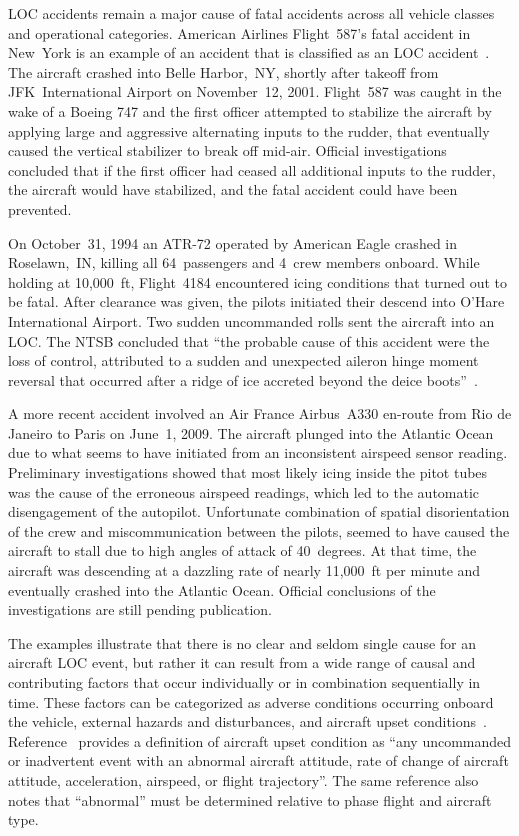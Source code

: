 \documentclass[letter,onecolumn,12pt]{aiaa-tc}
\begin{document}
LOC accidents remain a major cause of fatal accidents across all vehicle classes and operational categories. American Airlines Flight~587's fatal accident in New~York is an example of an accident that is classified as an LOC accident~\cite{MST08_upsets}. The aircraft crashed into Belle Harbor,~NY, shortly after takeoff from JFK~International Airport on November~12, 2001. Flight~587 was caught in the wake of a Boeing 747 and the first officer attempted to stabilize the aircraft by applying large and aggressive alternating inputs to the rudder, that eventually caused the vertical stabilizer to break off mid-air. Official investigations concluded that if the first officer had ceased all additional inputs to the rudder, the aircraft would have stabilized, and the fatal accident could have been prevented.


On October~31, 1994 an ATR-72 operated by American Eagle crashed in Roselawn,~IN, killing all 64~passengers and 4~crew members onboard. While holding at 10,000~ft, Flight~4184 encountered icing conditions that turned out to be fatal. After clearance was given, the pilots initiated their descend into O'Hare International Airport. Two sudden uncommanded rolls sent the aircraft into an LOC. The NTSB concluded that ``the probable cause of this accident were the loss of control, attributed to a sudden and unexpected aileron hinge moment reversal that occurred after a ridge of ice accreted beyond the deice boots''~\cite{ATR72}.


A more recent accident involved an Air France Airbus~A330 en-route from Rio de Janeiro to Paris on June~1, 2009. The aircraft plunged into the Atlantic Ocean due to what seems to have initiated from an inconsistent airspeed sensor reading. Preliminary investigations showed that most likely icing inside the pitot tubes was the cause of the erroneous airspeed readings, which led to the automatic disengagement of the autopilot. Unfortunate combination of spatial disorientation of the crew and miscommunication between the pilots, seemed to have caused the aircraft to stall due to high angles of attack of 40~degrees. At that time, the aircraft was descending at a dazzling rate of nearly 11,000~ft per minute and eventually crashed into the Atlantic Ocean. Official conclusions of the investigations are still pending publication.


The examples illustrate that there is no clear and seldom single cause for an aircraft LOC event, but rather it can result from a wide range of causal and contributing factors that occur individually or in combination sequentially in time. These factors can be categorized as adverse conditions occurring onboard the vehicle, external hazards and disturbances, and aircraft upset conditions~\cite{LOC10_Belcastro_concept}. Reference~\cite{MST08_upsets} provides a definition of aircraft upset condition as ``any uncommanded or inadvertent event with an abnormal aircraft attitude, rate of change of aircraft attitude, acceleration, airspeed, or flight trajectory''. The same reference also notes that ``abnormal'' must be determined relative to phase flight and aircraft type.
\end{document}
